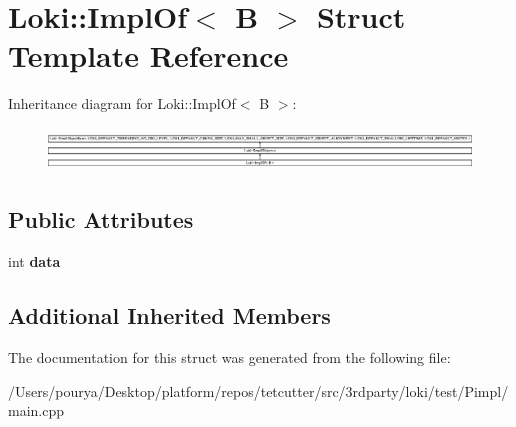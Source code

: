 \hypertarget{structLoki_1_1ImplOf_3_01B_01_4}{}\section{Loki\+:\+:Impl\+Of$<$ B $>$ Struct Template Reference}
\label{structLoki_1_1ImplOf_3_01B_01_4}
Inheritance diagram for Loki\+:\+:Impl\+Of$<$ B $>$\+:\begin{figure}[H]
\begin{center}
\leavevmode
\includegraphics[height=1.150685cm]{structLoki_1_1ImplOf_3_01B_01_4}
\end{center}
\end{figure}
\subsection*{Public Attributes}
\begin{DoxyCompactItemize}
\item 
\hypertarget{structLoki_1_1ImplOf_3_01B_01_4_ae53b9fbc5db4416575dc7214d5e982fe}{}int {\bfseries data}\label{structLoki_1_1ImplOf_3_01B_01_4_ae53b9fbc5db4416575dc7214d5e982fe}

\end{DoxyCompactItemize}
\subsection*{Additional Inherited Members}


The documentation for this struct was generated from the following file\+:\begin{DoxyCompactItemize}
\item 
/\+Users/pourya/\+Desktop/platform/repos/tetcutter/src/3rdparty/loki/test/\+Pimpl/main.\+cpp\end{DoxyCompactItemize}
